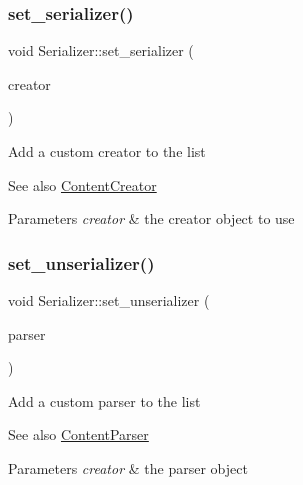 \subsubsection{\texorpdfstring{set\+\_\+serializer()}{set\_serializer()}}
{\footnotesize\ttfamily void Serializer\+::set\+\_\+serializer (\begin{DoxyParamCaption}\item[{\mbox{\hyperlink{classContentCreator}{Content\+Creator}} $\ast$}]{creator }\end{DoxyParamCaption})\hspace{0.3cm}{\ttfamily [inherited]}}

Add a custom creator to the list \begin{DoxySeeAlso}{See also}
\mbox{\hyperlink{classContentCreator}{Content\+Creator}}
\end{DoxySeeAlso}

\begin{DoxyParams}{Parameters}
{\em creator} & the creator object to use \\
\hline
\end{DoxyParams}
\mbox{\label{classSerializer_a74ea868b820b4a8472da98c0045418fa}} 
\subsubsection{\texorpdfstring{set\+\_\+unserializer()}{set\_unserializer()}}
{\footnotesize\ttfamily void Serializer\+::set\+\_\+unserializer (\begin{DoxyParamCaption}\item[{\mbox{\hyperlink{classContentParser}{Content\+Parser}} $\ast$}]{parser }\end{DoxyParamCaption})\hspace{0.3cm}{\ttfamily [inherited]}}

Add a custom parser to the list \begin{DoxySeeAlso}{See also}
\mbox{\hyperlink{classContentParser}{Content\+Parser}}
\end{DoxySeeAlso}

\begin{DoxyParams}{Parameters}
{\em creator} & the parser object \\
\hline
\end{DoxyParams}
\mbox{\label{classSerializer_a423fb7c43ca9c23e07000dba0c5a432a}} 

